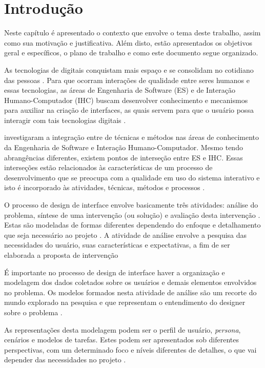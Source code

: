 \chapter{Introdução}
\label{chap:intro}

Neste capítulo é apresentado o contexto que envolve o tema deste trabalho, assim como sua motivação e justificativa. Além disto, estão apresentados os objetivos geral e específicos, o plano de trabalho e como este documento segue organizado. 

As tecnologias de digitais conquistam mais espaço e se consolidam no cotidiano das pessoas \cite{Sales2020}. Para que ocorram interações de qualidade entre seres humanos e essas tecnologias, as áreas de Engenharia de Software (ES) e de Interação Humano-Computador (IHC) buscam desenvolver conhecimento e mecanismos para auxiliar na criação de interfaces, as quais servem para que o usuário possa interagir com tais tecnologias digitais \cite[p. 3, 8-10]{BarbosaEtAl2021}.  

 investigaram a integração entre de técnicas e métodos nas áreas de conhecimento da Engenharia de Software e Interação Humano-Computador. Mesmo tendo abrangências diferentes, existem pontos de interseção entre ES e IHC. Essas interseções estão relacionados às características de um processo de desenvolvimento que se preocupa com a qualidade em uso do sistema interativo e isto é incorporado às atividades, técnicas, métodos e processos \cite[p. 114-115]{BarbosaEtAl2021}.

O processo de design de interface envolve basicamente três atividades: análise do problema, síntese de uma intervenção (ou solução) e avaliação desta intervenção \cite{lawson2006}. Estas são modeladas de formas diferentes dependendo do enfoque e detalhamento que seja necessário ao projeto \cite[p. 98-99]{BarbosaEtAl2021}. A atividade de análise envolve a pesquisa das necessidades do usuário, suas características e expectativas, a fim de ser elaborada a proposta de intervenção \cite[p. 121]{BarbosaEtAl2021}

É importante no processo de design de interface haver a organização e modelagem dos dados coletados sobre os usuários e demais elementos envolvidos no problema. Os modelos formados nesta atividade de análise são um recorte do mundo explorado na pesquisa e que representam o entendimento do designer sobre o problema \cite[p. 151]{BarbosaEtAl2021}. 

As representações desta modelagem podem ser o perfil de usuário, \textit{persona}, cenários e modelos de tarefas. Estes podem ser apresentados sob diferentes perspectivas, com um determinado foco e níveis diferentes de detalhes, o que vai depender das necessidades no projeto \cite[p. 151]{BarbosaEtAl2021}.

